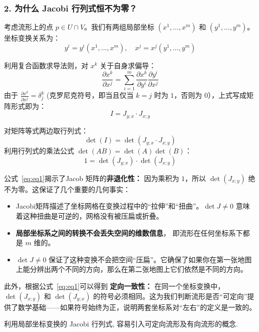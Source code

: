 \begin{myremark}
\subsubsection*{ \textbf{2. 为什么 Jacobi 行列式恒不为零？}}

考虑流形上的点 $p \in U \cap V$。我们有两组局部坐标 $(x^1, \dots, x^m)$ 和 $(y^1, \dots, y^m)$。坐标变换关系为：
$$ y^i = y^i(x^1, \dots, x^m), \quad x^j = x^j(y^1, \dots, y^m) $$

利用复合函数求导法则，对 $x^k$ 关于自身求偏导：
$$ \frac{\partial x^k}{\partial x^j} = \sum_{i=1}^m \frac{\partial x^k}{\partial y^i} \frac{\partial y^i}{\partial x^j} $$
由于 $\frac{\partial x^k}{\partial x^j} = \delta_j^k$ (克罗尼克符号，即当且仅当 $k=j$ 时为 $1$，否则为 $0$），上式写成矩阵形式即为：
$$ I = J_{y;x} \cdot J_{x;y} $$

对矩阵等式两边取行列式：
$$ \det(I) = \det(J_{y;x} \cdot J_{x;y}) $$
利用行列式的乘法公式 $\det(AB) = \det(A)\det(B)$：
\begin{equation}\label{eq:eq1}
 1 = \det(J_{y;x}) \cdot \det(J_{x;y}) 
 \end{equation}

公式~\eqref{eq:eq1}揭示了Jacob 矩阵的\textbf{非退化性：} 因为乘积为 $1$，所以 $\det(J_{x;y})$ 绝不为零。这保证了几个重要的几何事实：
    \begin{itemize}
   \item Jacobi矩阵描述了坐标网格在变换过程中的“拉伸”和“扭曲”。$\det J \neq 0$ 意味着这种扭曲是可逆的，网格没有被压扁或折叠。
   \item \textbf{局部坐标系之间的转换不会丢失空间的维数信息}， 即流形在任何坐标系下都是 $m$ 维的。
   \item $\det J \neq 0$ 保证了这种变换不会把空间“压扁”。它确保了如果你在第一张地图上能分辨出两个不同的方向，那么在第二张地图上它们依然是不同的方向。
   \end{itemize}
\end{myremark}

此外，根据公式~\eqref{eq:eq1}可以得到 \textbf{定向一致性：} 在同一个坐标变换中，$\det(J_{x;y})$ 和 $\det(J_{y;x})$ 的符号必须相同。这为我们判断流形是否“可定向”提供了数学基础——如果符号始终为正，说明两套坐标系对“左右”的定义是一致的。

利用局部坐标变换的 Jacobi 行列式, 容易引入可定向流形及有向流形的概念.


